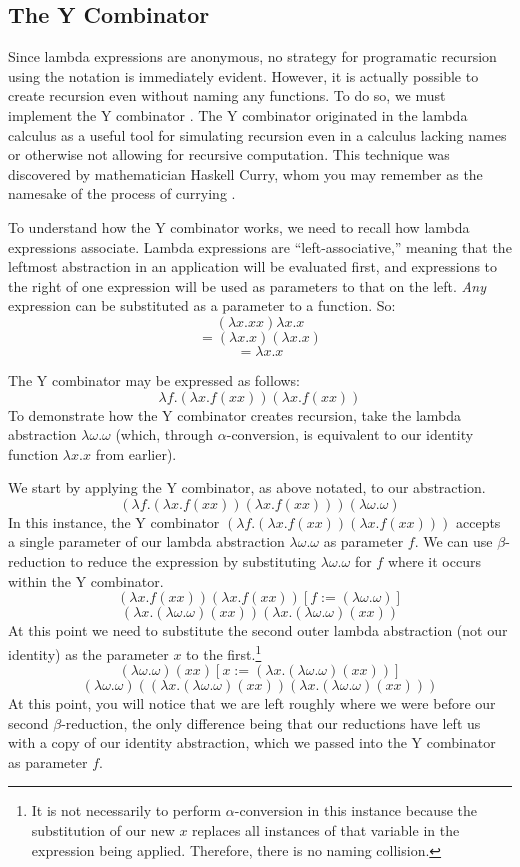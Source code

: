 \documentclass[twocolumn,titlepage,12pt]{article}
\begin{document}
\subsection{The Y Combinator}
Since lambda expressions are anonymous, no strategy for programatic recursion using the notation is immediately evident. However, it is actually possible to create recursion even without naming any functions. To do so, we must implement the Y combinator \cite{ycombmedium}. The Y combinator originated in the lambda calculus as a useful tool for simulating recursion even in a calculus lacking names or otherwise not allowing for recursive computation. This technique was discovered by mathematician Haskell Curry, whom you may remember as the namesake of the process of currying \cite{compphileyc}.

To understand how the Y combinator works, we need to recall how lambda expressions associate. Lambda expressions are ``left-associative,'' meaning that the leftmost abstraction in an application will be evaluated first, and expressions to the right of one expression will be used as parameters to that on the left. \textit{Any} expression can be substituted as a parameter to a function. So:
$$(\lambda x.xx)\lambda x.x$$
$$=(\lambda x.x)(\lambda x.x)$$
$$=\lambda x.x$$

The Y combinator may be expressed as follows:
$$\lambda f.(\lambda x.f(x x))(\lambda x.f(x x))$$
To demonstrate how the Y combinator creates recursion, take the lambda abstraction $\lambda \omega.\omega$ (which, through $\alpha$-conversion, is equivalent to our identity function $\lambda x.x$ from earlier).

We start by applying the Y combinator, as above notated, to our abstraction.
$$(\lambda f.(\lambda x.f(x x))(\lambda x.f(x x)))(\lambda \omega.\omega)$$
In this instance, the Y combinator $(\lambda f.(\lambda x.f(x x))(\lambda x.f(x x)))$ accepts a single parameter of our lambda abstraction $\lambda \omega.\omega$ as parameter $f$. We can use $\beta$-reduction to reduce the expression by substituting $\lambda \omega.\omega$ for $f$ where it occurs within the Y combinator.
$$(\lambda x.f(x x))(\lambda x.f(x x))[f:=(\lambda \omega.\omega)]$$
$$(\lambda x.(\lambda \omega.\omega)(x x))(\lambda x.(\lambda \omega.\omega)(x x))$$
At this point we need to substitute the second outer lambda abstraction (not our identity) as the parameter $x$ to the first.\footnote{It is not necessarily to perform $\alpha$-conversion in this instance because the substitution of our new $x$ replaces all instances of that variable in the expression being applied. Therefore, there is no naming collision.}
$$(\lambda \omega.\omega)(x x)[x:=(\lambda x.(\lambda \omega.\omega)(x x))]$$
$$(\lambda \omega.\omega)((\lambda x.(\lambda \omega.\omega)(x x))(\lambda x.(\lambda \omega.\omega)(x x)))$$
At this point, you will notice that we are left roughly where we were before our second $\beta$-reduction, the only difference being that our reductions have left us with a copy of our identity abstraction, which we passed into the Y combinator as parameter $f$.
\end{document}
